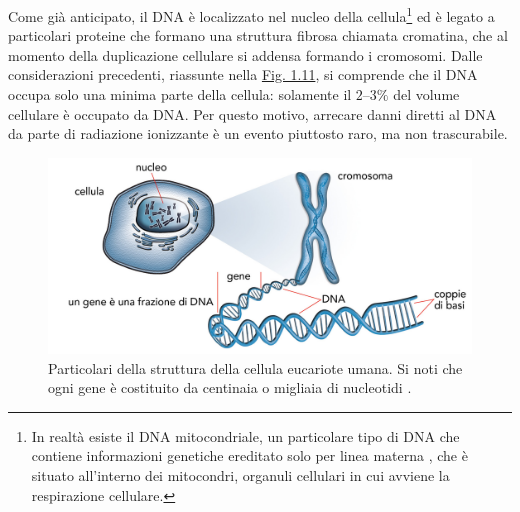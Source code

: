 \documentclass[12pt,a4paper,twoside]{report}
\begin{document}
	Come già anticipato, il DNA è localizzato nel nucleo della cellula\footnote{In realtà esiste il DNA mitocondriale, un particolare tipo di DNA che contiene informazioni genetiche ereditato solo per linea materna \cite{campbell2anno}, che è situato all'interno dei mitocondri, organuli cellulari in cui avviene la respirazione cellulare.} ed è legato a particolari proteine che formano una struttura fibrosa chiamata cromatina, che al momento della duplicazione cellulare si addensa formando i cromosomi. Dalle considerazioni precedenti, riassunte nella \hyperref[fig:cell]{Fig. 1.11}, si comprende che il DNA occupa solo una minima parte della cellula: solamente il $2$--$3\%$ del volume cellulare è occupato da DNA. Per questo motivo, arrecare danni diretti al DNA da parte di radiazione ionizzante è un evento piuttosto raro, ma non trascurabile.
	\begin{figure}[H]
		\centering
		\includegraphics[width=0.9\linewidth]{cell.jpg}
		\caption{Particolari della struttura della cellula eucariote umana. Si noti che ogni gene è costituito da centinaia o migliaia di nucleotidi \cite{dbook}.}
		\label{fig:cell}
	\end{figure}
\end{document}
